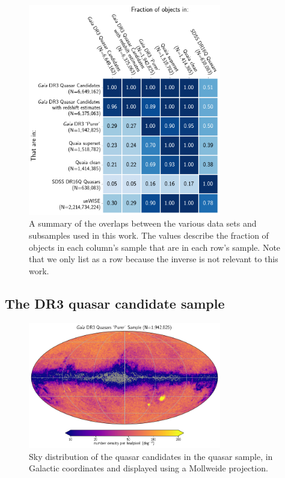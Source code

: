 \begin{figure}
    \centering
    \includegraphics[width=0.75\textwidth]{frac_matrix.png}
    \caption{A summary of the overlaps between the various data sets and subsamples used in this work. The values describe the fraction of objects in each column's sample that are in each row's sample. Note that we only list \unWISE as a row because the inverse is not relevant to this work.}
    \label{fig:frac_matrix}
\end{figure}

\subsection{The \Gaia DR3 quasar candidate sample}
\label{sec:data_gaia}

\begin{figure}
    \centering
    \includegraphics[width=0.75\textwidth]{gpurer_2d.png}
    \caption{Sky distribution of the quasar candidates in the \Gaiapurer quasar sample, in Galactic coordinates and displayed using a Mollweide projection.}
    \label{fig:gaia_2d_purer}
\end{figure}

